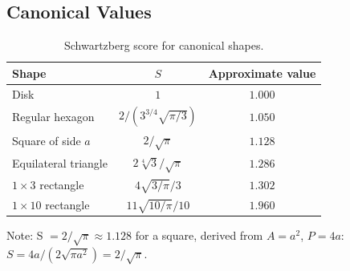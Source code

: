 \subsection{Canonical Values}

\begin{table}[ht]
\centering
\caption{Schwartzberg score for canonical shapes.}
\label{tab:s_canonical}
\begin{tabular}{lcc}
\toprule
Shape & $S$ & Approximate value \\
\midrule
Disk & $1$ & $1.000$ \\
Regular hexagon & $2 / (3^{3/4} \sqrt{\pi/3})$ & $1.050$ \\
Square of side $a$ & $2/\sqrt{\pi}$ & $1.128$ \\
Equilateral triangle & $2\sqrt[4]{3}/\sqrt{\pi}$ & $1.286$ \\
$1\times 3$ rectangle & $4\sqrt{3/\pi}/3$ & $1.302$ \\
$1\times 10$ rectangle & $11\sqrt{10/\pi}/10$ & $1.960$ \\
\bottomrule
\end{tabular}
\end{table}

Note: S $= 2/\sqrt{\pi} \approx 1.128$ for a square, derived from
$A = a^2$, $P = 4a$: $S = 4a / (2\sqrt{\pi a^2}) = 2/\sqrt{\pi}$.
